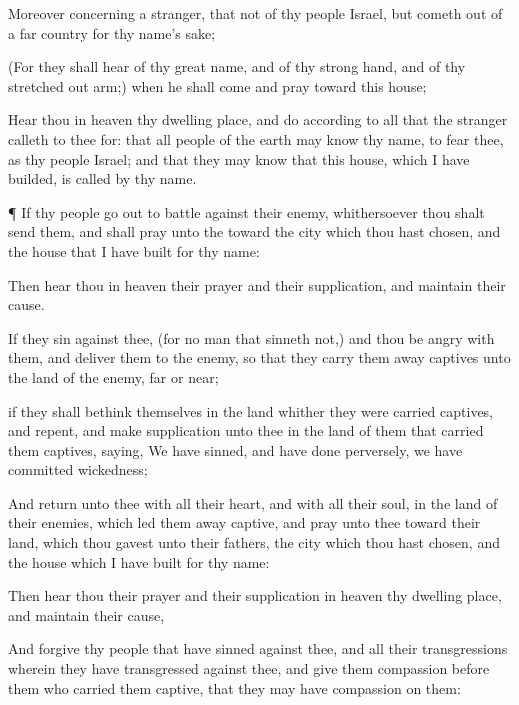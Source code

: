 {Moreover concerning a
stranger, that
{} not of thy
people
Israel, but cometh
out of a
far
country
for thy
name’s sake;

(For they shall
hear of thy
great
name, and of thy
strong
hand, and of thy stretched
out
arm;) when he shall
come and
pray toward this
house;

Hear thou in
heaven thy
dwelling
place, and
do according to all that the
stranger
calleth to thee for: that all
people of the
earth may
know thy
name, to
fear thee, as
{} thy
people
Israel; and that they may
know that this
house, which I have
builded, is
called by thy
name.


\par }{\PP {}¶ If thy
people go
out to
battle against their
enemy,
whithersoever thou shalt
send them, and shall
pray unto the
{}
toward the
city which thou hast
chosen, and
{} the
house that I have
built for thy
name:

Then
hear thou in
heaven their
prayer and their
supplication, and
maintain their
cause.

If they
sin against thee, (for
{} no
man that
sinneth not,) and thou be
angry with them, and
deliver them to the
enemy, so that they carry them
away
captives
unto the
land of the
enemy,
far or
near;

 if they shall
bethink themselves in the
land whither they were carried
captives, and
repent, and make
supplication unto thee in the
land of them that carried them
captives,
saying, We have
sinned, and have done
perversely, we have committed
wickedness;

And
{}
return unto thee with all their
heart, and with all their
soul, in the
land of their
enemies, which led them away
captive, and
pray unto thee
toward their
land, which thou
gavest unto their
fathers, the
city which thou hast
chosen, and the
house which I have
built for thy
name:

Then
hear thou their
prayer and their
supplication in
heaven thy
dwelling
place, and
maintain their
cause,

And
forgive thy
people that have
sinned against thee, and all their
transgressions wherein they have
transgressed against thee, and
give them
compassion
before them who carried them
captive, that they may have
compassion on them:

}
